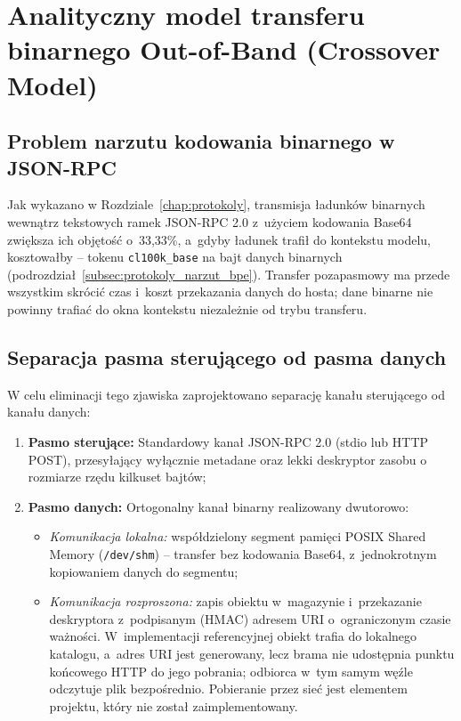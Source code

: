 \section{Analityczny model transferu binarnego Out-of-Band (Crossover Model)}
\label{sec:projekt_oob}

\subsection{Problem narzutu kodowania binarnego w JSON-RPC}
\label{subsec:projekt_narzut_base64}

Jak wykazano w Rozdziale~\ref{chap:protokoly}, transmisja ładunków binarnych wewnątrz tekstowych ramek JSON-RPC 2.0 z~użyciem kodowania Base64 zwiększa ich objętość o~33,33\%, a~gdyby ładunek trafił do kontekstu modelu, kosztowałby \wynOfiveTokPerByteMin--\wynOfiveTokPerByteMax{} tokenu \texttt{cl100k\_base} na bajt danych binarnych (podrozdział~\ref{subsec:protokoly_narzut_bpe}). Transfer pozapasmowy ma przede wszystkim skrócić czas i~koszt przekazania danych do hosta; dane binarne nie powinny trafiać do okna kontekstu niezależnie od trybu transferu.

\subsection{Separacja pasma sterującego od pasma danych}
\label{subsec:projekt_separacja_pasm}

W celu eliminacji tego zjawiska zaprojektowano separację kanału sterującego od kanału danych:
\begin{enumerate}
    \item \textbf{Pasmo sterujące:} Standardowy kanał JSON-RPC 2.0 (stdio lub HTTP POST), przesyłający wyłącznie metadane oraz lekki deskryptor zasobu o rozmiarze rzędu kilkuset bajtów;
    \item \textbf{Pasmo danych:} Ortogonalny kanał binarny realizowany dwutorowo:
    \begin{itemize}
        \item \emph{Komunikacja lokalna:} współdzielony segment pamięci POSIX Shared Memory (\texttt{/dev/shm}) -- transfer bez kodowania Base64, z~jednokrotnym kopiowaniem danych do segmentu;
        \item \emph{Komunikacja rozproszona:} zapis obiektu w~magazynie i~przekazanie deskryptora z~podpisanym (HMAC) adresem URI o~ograniczonym czasie ważności. W~implementacji referencyjnej obiekt trafia do lokalnego katalogu, a~adres URI jest generowany, lecz brama nie udostępnia punktu końcowego HTTP do jego pobrania; odbiorca w~tym samym węźle odczytuje plik bezpośrednio. Pobieranie przez sieć jest elementem projektu, który nie został zaimplementowany.
    \end{itemize}
\end{enumerate}

